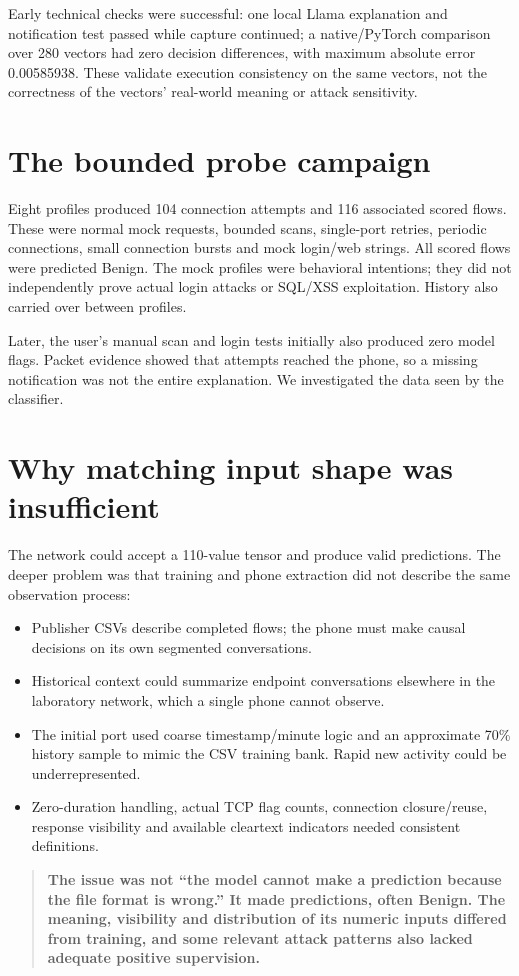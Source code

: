 \documentclass[11pt,a4paper,oneside]{report}
\newcommand{\important}[1]{\begin{quote}\color{blue!45!black}\textbf{#1}\end{quote}}
\begin{document}
Early technical checks were successful: one local Llama explanation and notification test passed while capture continued; a native/PyTorch comparison over 280 vectors had zero decision differences, with maximum absolute error 0.00585938. These validate execution consistency on the same vectors, not the correctness of the vectors' real-world meaning or attack sensitivity.

\section{The bounded probe campaign}
Eight profiles produced 104 connection attempts and 116 associated scored flows. These were normal mock requests, bounded scans, single-port retries, periodic connections, small connection bursts and mock login/web strings. All scored flows were predicted Benign. The mock profiles were behavioral intentions; they did not independently prove actual login attacks or SQL/XSS exploitation. History also carried over between profiles.

Later, the user's manual scan and login tests initially also produced zero model flags. Packet evidence showed that attempts reached the phone, so a missing notification was not the entire explanation. We investigated the data seen by the classifier.

\section{Why matching input shape was insufficient}
The network could accept a 110-value tensor and produce valid predictions. The deeper problem was that training and phone extraction did not describe the same observation process:
\begin{itemize}
\item Publisher CSVs describe completed flows; the phone must make causal decisions on its own segmented conversations.
\item Historical context could summarize endpoint conversations elsewhere in the laboratory network, which a single phone cannot observe.
\item The initial port used coarse timestamp/minute logic and an approximate 70\% history sample to mimic the CSV training bank. Rapid new activity could be underrepresented.
\item Zero-duration handling, actual TCP flag counts, connection closure/reuse, response visibility and available cleartext indicators needed consistent definitions.
\end{itemize}
\important{The issue was not ``the model cannot make a prediction because the file format is wrong.'' It made predictions, often Benign. The meaning, visibility and distribution of its numeric inputs differed from training, and some relevant attack patterns also lacked adequate positive supervision.}
\end{document}
